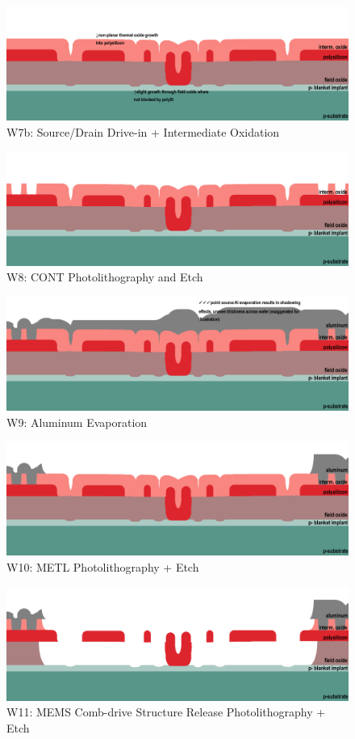 \documentclass{article}
\begin{document}
\begin{figure}[H]
\centering
\includegraphics[width=350pt]{CrossSections_Updates/MEMSw7b_note.png}
\caption{W7b: Source/Drain Drive-in + Intermediate Oxidation}
\end{figure}
\begin{figure}[H]
\centering
\includegraphics[width=350pt]{CrossSections_Updates/MEMSw8.png}
\caption{W8: CONT Photolithography and Etch}
\end{figure}
\begin{figure}[H]
\centering
\includegraphics[width=350pt]{CrossSections_Updates/MEMSw9_notes.png}
\caption{W9: Aluminum Evaporation}
\end{figure}
\begin{figure}[H]
\centering
\includegraphics[width=350pt]{CrossSections_Updates/MEMSw10.png}
\caption{W10: METL Photolithography + Etch}
\end{figure}
\begin{figure}[H]
\centering
\includegraphics[width=350pt]{CrossSections_Updates/MEMSw11.png}
\caption{W11: MEMS Comb-drive Structure Release Photolithography + Etch}
\end{figure}
\end{document}
